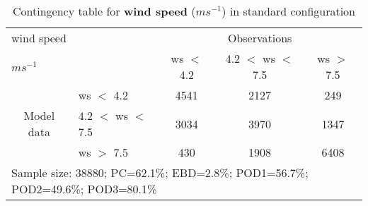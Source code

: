 \begin{table}[]
\begin{center}
\begin{tabular}{llccc}
\hline
{wind speed}                                       &                                                    & \multicolumn{3}{c}{Observations}                 \\
{$m s^{-1}$}                                       &                             & ws $<$ 4.2   & 4.2 $<$ ws $<$ 7.5 & ws $>$ 7.5 \\
\hline
\multicolumn{1}{c}{\multirow{3}{*}{Model data}}  & ws $<$ 4.2             & 4541                & 2127                       & 249              \\
                                                 & 4.2  $<$ ws $<$ 7.5 & 3034                & 3970                       & 1347              \\
                                                 & ws $>$ 7.5             & 430                & 1908                       & 6408              \\
\hline 
\multicolumn{5}{l}{Sample size: 38880; PC=62.1\%; EBD=2.8\%; POD1=56.7\%; POD2=49.6\%; POD3=80.1\%}                 \\
\end{tabular}
\end{center}
\caption{Contingency table for \textbf{wind speed} ($m s^{-1}$) in standard configuration}
\label{tab:contingencywsBEF}
\end{table}
